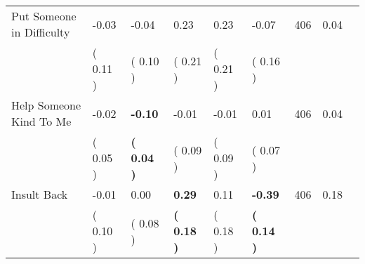 \begin{tabular}{L{6.2cm} C{1.8cm} C{1.8cm} C{1.8cm} C{1.8cm} C{1.8cm} C{1.8cm} C{0.3cm} C{0.3cm}}
Put Someone in Difficulty &     -0.03 &     -0.04 &      0.23 &      0.23 &     -0.07  & 406 &       0.04 \\ 
 & (     0.11 ) & (     0.10 ) & (     0.21 ) & (     0.21 ) & (     0.16 )  & \\
Help Someone Kind To Me &     -0.02 & \textbf{    -0.10} &     -0.01 &     -0.01 &      0.01  & 406 &       0.04 \\ 
 & (     0.05 ) & \textbf{(     0.04 )} & (     0.09 ) & (     0.09 ) & (     0.07 )  & \\
Insult Back &     -0.01 &      0.00 & \textbf{     0.29} &      0.11 & \textbf{    -0.39}  & 406 &       0.18 \\ 
 & (     0.10 ) & (     0.08 ) & \textbf{(     0.18 )} & (     0.18 ) & \textbf{(     0.14 )}  & \\
\bottomrule
\end{tabular}
